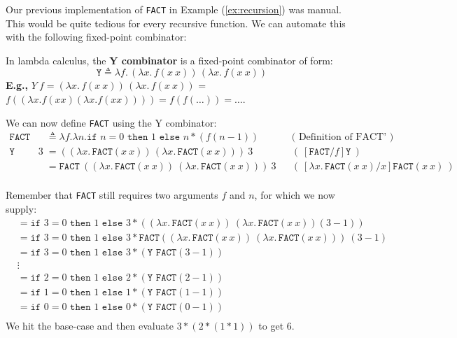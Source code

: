 \noindent
Our previous implementation of \texttt{FACT} in Example (\ref{ex:recursion}) was manual. This would be 
quite tedious for every recursive function. We can automate this with the following fixed-point combinator:
\begin{Def}[Y-Combinator]

    \label{def:y-combinator}
    In lambda calculus, the \textbf{Y combinator} is a fixed-point combinator of form:
    \LARGE
    \[
        \texttt{Y} \triangleq \lambda f.\, (\lambda x.\, f (x\ x))\, (\lambda x.\, f (x\ x))
    \]
    \normalsize
    \noindent
    \textbf{E.g.,} $Y\ f = (\lambda x.\, f (x\ x))\, (\lambda x.\, f (x\ x))$ = $f((\lambda x.f(xx)(\lambda x.f(xx))))=f(f(\dots))=\dots$.

\end{Def}

\begin{Example}

    \label{ex:factorial-y}
    We can now define \texttt{FACT} using the Y combinator:
    \begin{align*}
    \texttt{FACT} &\triangleq \lambda f.\lambda n. \texttt{if } n = 0 \texttt{ then } 1 \texttt{ else } n * (f(n - 1)) && \text{( Definition of FACT' )} \\
    \texttt{Y FACT } 3 & = ((\lambda x.\, \texttt{FACT} (x\ x))\, (\lambda x.\, \texttt{FACT} (x\ x)))\ 3 && (\ [\texttt{FACT}/f]\texttt{Y}\ )\\
    & = \texttt{FACT}\ ((\lambda x.\, \texttt{FACT} (x\ x))\ (\lambda x.\, \texttt{FACT} (x\ x)))\ 3 && (\ [\lambda x.\, \texttt{FACT} (x\ x)/x] \texttt{FACT} (x\ x)\ ) \\
    \end{align*}

    \vspace{-1em}
   \noindent
   Remember that \texttt{FACT} still requires two arguments $f$ and $n$, for which we now supply:
    \begin{align*}
        &= \texttt{if } 3 = 0 \texttt{ then } 1 \texttt{ else } 3 * ((\lambda x.\, \texttt{FACT} (x\ x))\ (\lambda x.\, \texttt{FACT} (x\ x))(3 - 1))\\
        &= \texttt{if } 3 = 0 \texttt{ then } 1 \texttt{ else } 3 * \texttt{FACT} ((\lambda x.\, \texttt{FACT} (x\ x))\ (\lambda x.\, \texttt{FACT} (x\ x)))\ (3 - 1)\\
        &= \texttt{if } 3 = 0 \texttt{ then } 1 \texttt{ else } 3 * (\texttt{Y FACT}(3 - 1)) \\
        &\vdots \\
        &= \texttt{if } 2 = 0 \texttt{ then } 1 \texttt{ else } 2 * (\texttt{Y FACT}(2 - 1)) \\
        &= \texttt{if } 1 = 0 \texttt{ then } 1 \texttt{ else } 1 * (\texttt{Y FACT}(1 - 1)) \\
        &= \texttt{if } 0 = 0 \texttt{ then } 1 \texttt{ else } 0 * (\texttt{Y FACT}(0 - 1)) \\
    \end{align*}
    \noindent
    We hit the base-case and then evaluate $3 * (2 * (1 * 1))$ to get $6$.
\end{Example}
\newpage

